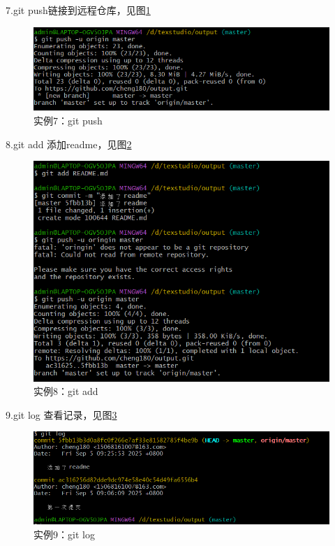 \documentclass{article}
\begin{document}
	\newpage
	
	7.git push链接到远程仓库，见图\ref{fig:example19}
	
		\begin{figure}[h]  
		\centering
		\includegraphics[width=1\textwidth]{7.png}
		\caption{实例7：git push}
		\label{fig:example19}
	\end{figure}
	
	8.git add 添加readme，见图\ref{fig:example20}
	
		\begin{figure}[h]  
		\centering
		\includegraphics[width=1\textwidth]{8.png}
		\caption{实例8：git add}
		\label{fig:example20}
	\end{figure}
	
	\newpage
	
	9.git log 查看记录，见图\ref{fig:example21}
	
		\begin{figure}[h]  
		\centering
		\includegraphics[width=1\textwidth]{9.png}
		\caption{实例9：git log}
		\label{fig:example21}
	\end{figure}
	
\end{document}
